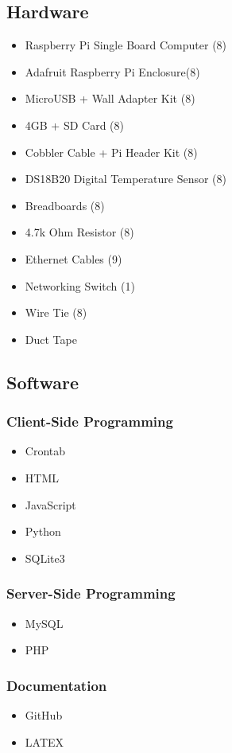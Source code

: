 \documentclass{article}
\begin{document}
		\subsection{Hardware}
			\begin{itemize}
				\item Raspberry Pi Single Board Computer (8)
				\item Adafruit Raspberry Pi Enclosure(8)
				\item MicroUSB + Wall Adapter Kit (8)
				\item 4GB + SD Card (8)
				\item Cobbler Cable + Pi Header Kit (8)
				\item DS18B20 Digital Temperature Sensor (8)
				\item Breadboards (8)
				\item 4.7k Ohm Resistor (8)
				\item Ethernet Cables (9)
				\item Networking Switch (1)
				\item Wire Tie (8)
				\item Duct Tape
			\end{itemize}
			
		\subsection{Software}
			\subsubsection{Client-Side Programming}
				\begin{itemize}
					\item Crontab
					\item HTML
					\item JavaScript
					\item Python
					\item SQLite3						
				\end{itemize}	
			\subsubsection{Server-Side Programming}
				\begin{itemize}
					\item MySQL
					\item PHP									
				\end{itemize}
			\subsubsection{Documentation}
				\begin{itemize}			
					\item GitHub
					\item LATEX
				\end{itemize}
		
\end{document}
